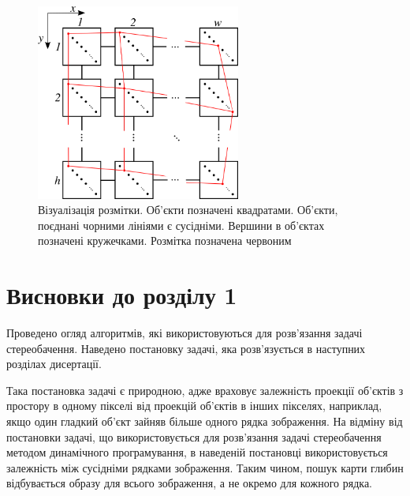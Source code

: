 \begin{figure}[h]
  \centering
  \includegraphics[width=0.6\textwidth]{images/labeling}
  \caption{Візуалізація розмітки.
           Об'єкти позначені квадратами.
           Об'єкти, поєднані чорними лініями є сусідніми.
           Вершини в об'єктах позначені кружечками.
           Розмітка позначена червоним}
  \label{fig:labeling}
\end{figure}

\section*{Висновки до розділу 1}

Проведено огляд алгоритмів,
які використовуються для розв'язання задачі стереобачення.
Наведено постановку задачі,
яка розв'язується в наступних розділах дисертації.

Така постановка задачі є природною,
адже враховує залежність проекції об'єктів з простору
в одному пікселі від проекцій об'єктів в інших пікселях,
наприклад, якщо один гладкий об'єкт зайняв більше одного рядка зображення.
На відміну від постановки задачі,
що використовується для
розв'язання задачі стереобачення методом динамічного програмування,
в наведеній постановці використовується залежність між сусідніми рядками
зображення.
Таким чином, пошук карти глибин відбувається образу для всього зображення,
а не окремо для кожного рядка.
